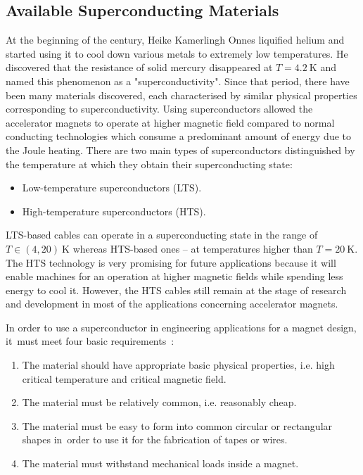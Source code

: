 
\subsection{Available Superconducting Materials}

At the beginning of the  century, Heike Kamerlingh Onnes liquified helium and started using it to cool down various metals to extremely low temperatures. He discovered that the resistance of solid mercury disappeared at $T=4.2~\text{K}$ and named this phenomenon as a "superconductivity". Since that period, there have been many materials discovered, each characterised by similar physical properties corresponding to superconductivity. Using superconductors allowed the accelerator magnets to operate at higher magnetic field compared to normal conducting technologies which consume a predominant amount of energy due to the Joule heating. There are two main types of superconductors distinguished by the temperature at which they obtain their superconducting state: 
\begin{itemize}
    \item Low-temperature superconductors (LTS).
    \item High-temperature superconductors (HTS).
\end{itemize}
LTS-based cables can operate in a superconducting state in the range of $T \in (4, 20)~\text{K}$ whereas HTS-based ones -- at temperatures higher than $T=20~\text{K}$. The HTS technology is very promising for future applications because it will enable machines for an operation at higher magnetic fields while spending less energy to cool it. However, the HTS cables still remain at the stage of research and development in most of the applications concerning accelerator magnets. ~\cite[p.~77-95]{evans_marvel_of_technology}

In order to use a superconductor in engineering applications for a magnet design, it~must meet four basic requirements~\cite[p.~77-95]{evans_marvel_of_technology}:

\begin{enumerate}
    \item The material should have appropriate basic physical properties, i.e. high critical temperature and critical magnetic field.
    \item The material must be relatively common, i.e. reasonably cheap.
    \item The material must be easy to form into common circular or rectangular shapes in~order to use it for the fabrication of tapes or wires.
    \item The material must withstand mechanical loads inside a magnet.
\end{enumerate}

